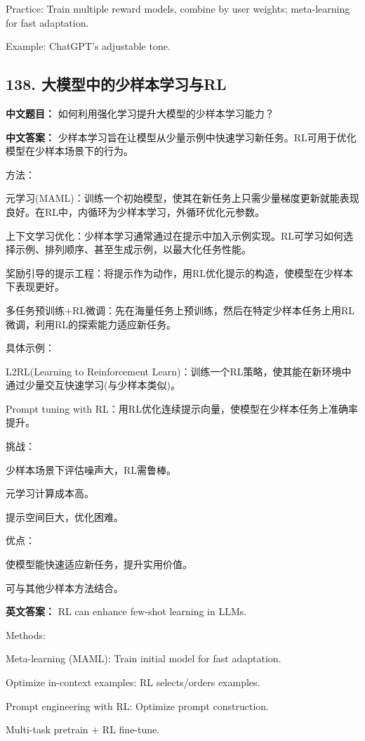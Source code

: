 \documentclass[10pt,a4paper]{ctexart}
\begin{document}
Practice: Train multiple reward models, combine by user weights; meta-learning for fast adaptation.

Example: ChatGPT's adjustable tone.

\subsection*{138. 大模型中的少样本学习与RL}
\textbf{中文题目：} 如何利用强化学习提升大模型的少样本学习能力？

\textbf{中文答案：}
少样本学习旨在让模型从少量示例中快速学习新任务。RL可用于优化模型在少样本场景下的行为。

方法：

元学习(MAML)：训练一个初始模型，使其在新任务上只需少量梯度更新就能表现良好。在RL中，内循环为少样本学习，外循环优化元参数。

上下文学习优化：少样本学习通常通过在提示中加入示例实现。RL可学习如何选择示例、排列顺序、甚至生成示例，以最大化任务性能。

奖励引导的提示工程：将提示作为动作，用RL优化提示的构造，使模型在少样本下表现更好。

多任务预训练+RL微调：先在海量任务上预训练，然后在特定少样本任务上用RL微调，利用RL的探索能力适应新任务。

具体示例：

L2RL(Learning to Reinforcement Learn)：训练一个RL策略，使其能在新环境中通过少量交互快速学习(与少样本类似)。

Prompt tuning with RL：用RL优化连续提示向量，使模型在少样本任务上准确率提升。

挑战：

少样本场景下评估噪声大，RL需鲁棒。

元学习计算成本高。

提示空间巨大，优化困难。

优点：

使模型能快速适应新任务，提升实用价值。

可与其他少样本方法结合。

\textbf{英文答案：}
RL can enhance few-shot learning in LLMs.

Methods:

Meta-learning (MAML): Train initial model for fast adaptation.

Optimize in-context examples: RL selects/orders examples.

Prompt engineering with RL: Optimize prompt construction.

Multi-task pretrain + RL fine-tune.
\end{document}
